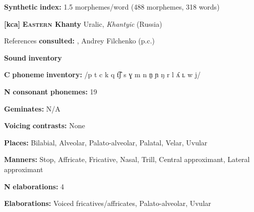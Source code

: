 \documentclass[output=paper]{langsci/langscibook}
\begin{document}
\begin{styleBody}
\textbf{Synthetic} \textbf{index:} 1.5 morphemes/word (488 morphemes, 318 words)
\end{styleBody}

\begin{styleBody}
\textbf{[kca]}   \textbf{\textsc{Eastern} \textbf{Khanty}}  Uralic, \textit{Khantyic} (Russia)
\end{styleBody}

\begin{styleBody}
References \textbf{consulted:} \citet{Filchenko2007}, Andrey Filchenko (p.c.)
\end{styleBody}

\begin{styleBody}
\textbf{Sound} \textbf{inventory}
\end{styleBody}

\begin{styleBody}
\textbf{C} \textbf{phoneme} \textbf{inventory:} /p t c k q t͡ʃ s ɣ m n n̠ ɲ ŋ r l ʎ ʟ w j/
\end{styleBody}

\begin{styleBody}
\textbf{N} \textbf{consonant} \textbf{phonemes:} 19
\end{styleBody}

\begin{styleBody}
\textbf{Geminates:} N/A
\end{styleBody}

\begin{styleBody}
\textbf{Voicing} \textbf{contrasts:} None
\end{styleBody}

\begin{styleBody}
\textbf{Places:} Bilabial, Alveolar, Palato-alveolar, Palatal, Velar, Uvular
\end{styleBody}

\begin{styleBody}
\textbf{Manners:} Stop, Affricate, Fricative, Nasal, Trill, Central approximant, Lateral approximant
\end{styleBody}

\begin{styleBody}
\textbf{N} \textbf{elaborations:} 4
\end{styleBody}

\begin{styleBody}
\textbf{Elaborations:} Voiced fricatives/affricates, Palato-alveolar, Uvular
\end{styleBody}
\end{document}
